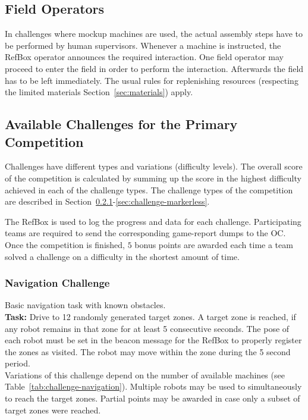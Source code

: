 \documentclass[12pt,twoside]{article}
\newcommand{\refsec}[1]{Section~\ref{#1}}
\newcommand{\reftab}[1]{Table~\ref{#1}}
\begin{document}
\subsection{Field Operators}\label{sec:operators}
In challenges where mockup machines are used, the actual assembly steps have
to be performed by human supervisors. Whenever a machine is instructed,
the RefBox operator announces the required interaction. One field operator may
proceed to enter the field in order to perform the interaction. Afterwards the
field has to be left immediately.
The usual rules for replenishing resources (respecting the limited materials
\refsec{sec:materials}) apply.

\subsection{Available Challenges for the Primary Competition}
Challenges have different types and variations (difficulty levels).
The overall score of the competition is calculated by summing up the score
in the highest difficulty achieved in each of the challenge types.
The challenge types of the competition are described in
\refsec{sec:challenge-navigation}-\ref{sec:challenge-markerless}.

The RefBox is used to log the progress and data for each challenge.
Participating teams are required to send the corresponding game-report dumps to the OC.
Once the competition is finished, $5$ bonus points are awarded each time a
team solved a challenge on a difficulty in the shortest amount of time.

\subsubsection{Navigation Challenge}\label{sec:challenge-navigation}
Basic navigation task with known obstacles.\\
\textbf{Task:} Drive to 12 randomly generated target zones. A target zone is
reached, if any robot remains in that zone for at least 5 consecutive seconds.
The pose of each robot must be set in the beacon message
for the RefBox to properly register the zones as visited. The robot may move
within the zone during the 5 second period.\\
Variations of this challenge depend on the number of available machines
(see \reftab{tab:challenge-navigation}).
Multiple robots may be used to simultaneously to reach the target zones.
Partial points may be awarded in case only a subset of target zones were
reached.
\end{document}
